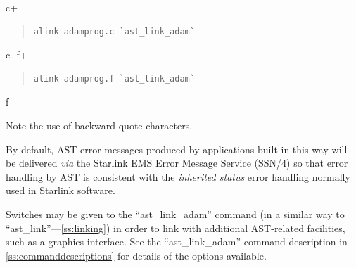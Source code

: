 \documentclass[twoside,11pt]{article}
\newcommand{\xref}[3]{#1}
\newcommand{\appref}[1]{Appendix~\ref{#1}}
\newcommand{\secref}[1]{\S\ref{#1}}
\renewcommand{\appref}[1]{\ref{#1}}
\renewcommand{\secref}[1]{\ref{#1}}
\begin{document}
c+
\begin{quote}
\small
\begin{verbatim}
alink adamprog.c `ast_link_adam`
\end{verbatim}
\normalsize
\end{quote}
c-
f+
\begin{quote}
\small
\begin{verbatim}
alink adamprog.f `ast_link_adam`
\end{verbatim}
\normalsize
\end{quote}
f-

Note the use of backward quote characters.

By default, AST error messages produced by applications built in this
way will be delivered {\em{via}} the Starlink EMS Error Message
Service (\xref{SSN/4}{ssn4}{}) so that error handling by AST is
consistent with the \xref{{\em{inherited
status}}}{sun104}{inherited_status} error handling normally used in
Starlink software.

Switches may be given to the ``ast\_link\_adam'' command (in a similar
way to ``ast\_link''---\secref{ss:linking}) in order to link with
additional AST-related facilities, such as a graphics interface. See
the ``ast\_link\_adam'' command description in
\appref{ss:commanddescriptions} for details of the options available.

\appendix






\end{document}
